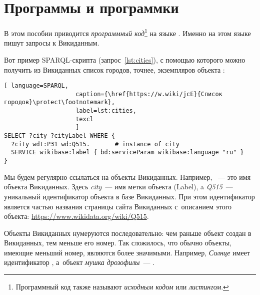 

\chapter{Программы и программки}
\label{ch:listing_about}

В этом пособии приводится \emph{программный код}\footnote[][0cm]{%
    Программный код также называют  \emph{исходным кодом} или 
    \emph{листингом}.
%   
} на языке . 
Именно на этом языке пишут запросы к Викиданным.


Вот пример SPARQL-скрипта (запрос~\ref{lst:cities}), 
с помощью которого можно получить из Викиданных список городов, 
точнее, экземпляров объекта
:

\begin{lstlisting}[ language=SPARQL, 
                    caption={\href{https://w.wiki/jcE}{Список городов}\protect\footnotemark},
                    label=lst:cities,
                    texcl 
                    ]
SELECT ?city ?cityLabel WHERE { 
  ?city wdt:P31 wd:Q515.       # instance of city
  SERVICE wikibase:label { bd:serviceParam wikibase:language "ru" }
}
\end{lstlisting}%

Мы будем регулярно ссылаться на объекты Викиданных. 
Например, ~--- это имя объекта Викиданных. 
Здесь \emph{city}~--- имя метки объекта (Label), 
a \emph{Q515}~--- уникальный идентификатор объекта в базе Викиданных. 
При этом идентификатор является частью названия страницы сайта Викиданных 
с~описанием этого объекта: \href{https://www.wikidata.org/wiki/Q515}{https://www.wikidata.org/wiki/Q515}.

\label{WDObjectsNumbering}
Объекты Викиданных нумеруются последовательно: чем раньше 
объект создан в Викиданных, тем меньше его номер. 
Так сложилось, что обычно объекты, имеющие меньший номер, являются более значимыми. 
Например, \emph{Солнце} имеет идентификатор , а~объект \emph{мушка дрозофилы}~--- .
